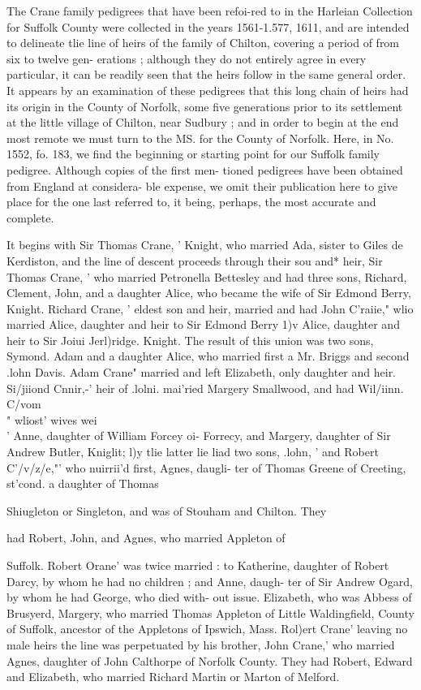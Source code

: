 \documentclass[oneside]{book}
\begin{document}
The Crane family pedigrees that have been refoi-red to in the 
Harleian Collection for Suffolk County were collected in the years 
1561-1.577, 1611, and are intended to delineate tlie line of heirs of 
the family of Chilton, covering a period of from six to twelve gen- 
erations ; although they do not entirely agree in every particular, 
it can be readily seen that the heirs follow in the same general 
order. It appears by an examination of these pedigrees that this 
long chain of heirs had its origin in the County of Norfolk, some 
five generations prior to its settlement at the little village of 
Chilton, near Sudbury ; and in order to begin at the end most 
remote we must turn to the MS. for the County of Norfolk. 
Here, in No. 1552, fo. 183, we find the beginning or starting point 
for our Suffolk family pedigree. Although copies of the first men- 
tioned pedigrees have been obtained from England at considera- 
ble expense, we omit their publication here to give place for the 
one last referred to, it being, perhaps, the most accurate and 
complete. 

It begins with Sir Thomas Crane, ' Knight, who married Ada, 
sister to Giles de Kerdiston, and the line of descent proceeds 
through their sou and* heir, Sir Thomas Crane, ' who married 
Petronella Bettesley and had three sons, Richard, Clement, John, 
and a daughter Alice, who became the wife of Sir Edmond Berry, 
Knight. Richard Crane, ' eldest son and heir, married and had 
John C'raiie," wlio married Alice, daughter and heir to Sir 
Edmond Berry 1)v Alice, daughter and heir to Sir Joiui Jerl)ridge. 
Knight. The result of this union was two sons, Symond. Adam 
and a daughter Alice, who married first a Mr. Briggs and second 
.lohn Davis. Adam Crane" married and left Elizabeth, only 
daughter and heir. Si/jiiond Cnnir,-' heir of .lolni. mai'ried 
Margery Smallwood, and had Wil/iinn. C/vom\\" wliost' wives wei\\' 
Anne, daughter of William Forcey oi- Forrecy, and Margery, 
daughter of Sir Andrew Butler, Kniglit; l)y tlie latter lie liad two 
sons, .lohn, ' and Robert C'/v/z/e,"' who nuirrii'd first, Agnes, daugli- 
ter of Thomas Greene of Creeting, st'cond. a daughter of Thomas 




Shiugleton or Singleton, and was of Stouham and Chilton. They 

had Robert, John, and Agnes, who married Appleton of 

Suffolk. Robert Orane' was twice married : to Katherine, daughter 
of Robert Darcy, by whom he had no children ; and Anne, daugh- 
ter of Sir Andrew Ogard, by whom he had George, who died with- 
out issue. Elizabeth, who was Abbess of Brusyerd, Margery, 
who married Thomas Appleton of Little Waldingfield, County of 
Suffolk, ancestor of the Appletons of Ipswich, Mass. Rol)ert 
Crane' leaving no male heirs the line was perpetuated by his 
brother, John Crane,' who married Agnes, daughter of John 
Calthorpe of Norfolk County. They had Robert, Edward and 
Elizabeth, who married Richard Martin or Marton of Melford. 
\end{document}
